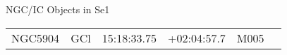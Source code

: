 \begin{block}{NGC/IC Objects in Se1}
  \centering
  \begin{tabularx}{\textwidth}{llrrll} 
    NGC5904 & GCl & 15:18:33.75 & +02:04:57.7  & M005 \\ 
  \end{tabularx}
\end{block}